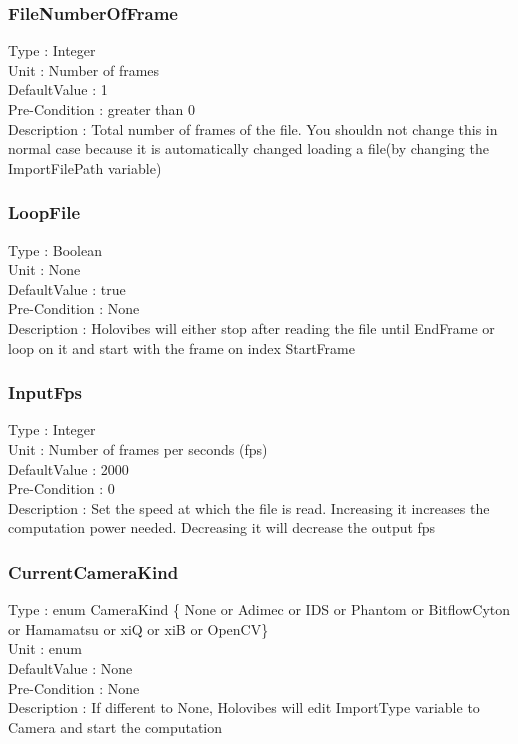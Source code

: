 \subsubsection{FileNumberOfFrame}
\noindent
Type : Integer\\
Unit : Number of frames\\
DefaultValue : 1\\
Pre-Condition : greater than 0\\
Description : Total number of frames of the file. You shouldn not change this in normal case because it is automatically changed loading a file(by changing the ImportFilePath variable)\\

\subsubsection{LoopFile}
\noindent
Type : Boolean\\
Unit : None\\
DefaultValue : true\\
Pre-Condition : None\\
Description : Holovibes will either stop after reading the file until EndFrame or loop on it and start with the frame on index StartFrame\\

\subsubsection{InputFps}
\noindent
Type : Integer\\
Unit : Number of frames per seconds (fps)\\
DefaultValue : 2000\\
Pre-Condition : 0\\
Description : Set the speed at which the file is read. Increasing it increases the computation power needed. Decreasing it will decrease the output fps\\

\subsubsection{CurrentCameraKind}
\noindent
Type : enum CameraKind \{ None or Adimec or IDS or Phantom or BitflowCyton or Hamamatsu or xiQ or xiB or OpenCV\}\\
Unit : enum \\
DefaultValue : None\\
Pre-Condition : None\\
Description : If different to None, Holovibes will edit ImportType variable to Camera and start the computation\\

